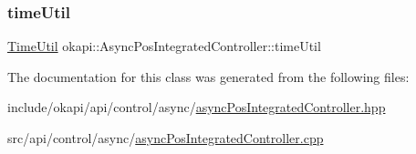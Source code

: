 \subsubsection{\texorpdfstring{timeUtil}{timeUtil}}
{\footnotesize\ttfamily \mbox{\hyperlink{classokapi_1_1TimeUtil}{Time\+Util}} okapi\+::\+Async\+Pos\+Integrated\+Controller\+::time\+Util\hspace{0.3cm}{\ttfamily [protected]}}



The documentation for this class was generated from the following files\+:\begin{DoxyCompactItemize}
\item 
include/okapi/api/control/async/\mbox{\hyperlink{asyncPosIntegratedController_8hpp}{async\+Pos\+Integrated\+Controller.\+hpp}}\item 
src/api/control/async/\mbox{\hyperlink{asyncPosIntegratedController_8cpp}{async\+Pos\+Integrated\+Controller.\+cpp}}\end{DoxyCompactItemize}
